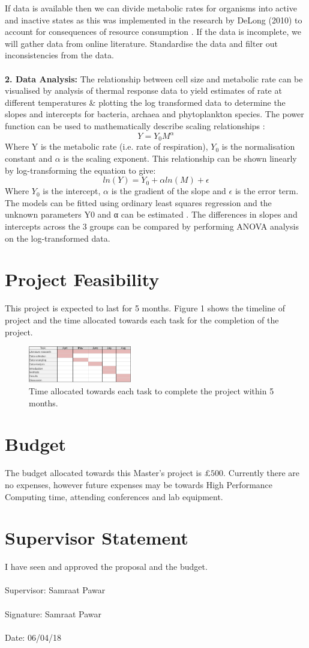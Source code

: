 \documentclass[11pt]{report}
\begin{document}
If data is available then we can divide metabolic rates for organisms into active and inactive states as this was implemented in the research by DeLong (2010) to account for consequences of resource consumption \citep{DeLong2010}. If the data is incomplete, we will gather data from online literature. Standardise the data and filter out inconsistencies from the data.
\\~\\
\textbf{2. Data Analysis:}
The relationship between cell size and metabolic rate can be visualised by analysis of thermal response data to yield estimates of rate at different temperatures \citep{Dell2013} \& plotting the log transformed data to determine the slopes and intercepts for bacteria, archaea and phytoplankton species. The power function can be used to mathematically describe scaling relationships \citep{DeLong2010}:
$$Y=Y_0M^{\alpha}$$
Where Y is the metabolic rate (i.e. rate of respiration), $Y_0$ is the normalisation constant and $\alpha$ is the scaling exponent. This relationship can be shown linearly by log-transforming the equation to give:
$$ln(Y)=Y_0+\alpha ln(M) + \epsilon$$
Where $Y_0$ is the intercept, $\alpha$ is the gradient of the slope and $\epsilon$ is the error term. \\
The models can be fitted using ordinary least squares regression and the unknown parameters Y0 and α can be estimated \citep{Garcia2016}. The differences in slopes and intercepts across the 3 groups can be compared by performing ANOVA analysis on the log-transformed data.

\section*{Project Feasibility}
This project is expected to last for 5 months. Figure 1 shows the timeline of project and the time allocated towards each task for the completion of the project.
\begin{figure}[h]
\centering
\includegraphics[width=0.4\textwidth]{project.png}
\caption{\label{fig:project.png}Time allocated towards each task to complete the project within 5 months.}
\end{figure}
\section*{Budget}
The budget allocated towards this Master's project is $\pounds 500$. Currently there are no expenses, however future expenses may be towards High Performance Computing time, attending conferences and lab equipment.

\newpage
\thispagestyle{empty}
\section*{Supervisor Statement}
I have seen and approved the proposal and the budget. 
\\
\\Supervisor: Samraat Pawar \\
\\
Signature:  Samraat Pawar\\
\\
Date: 06/04/18



\end{document}
